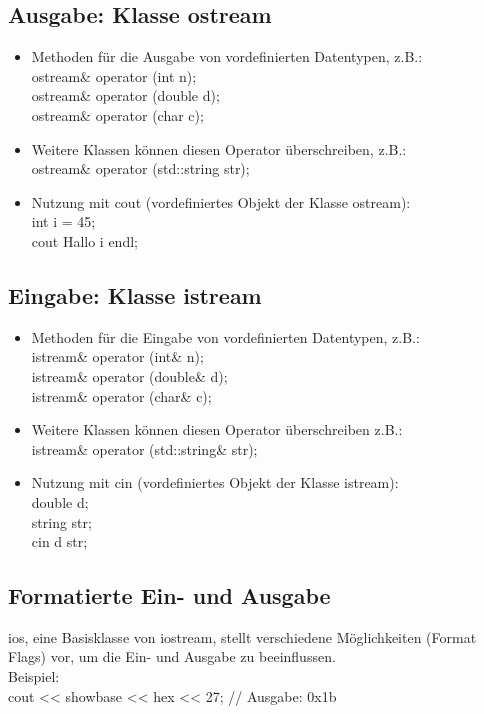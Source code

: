 \subsection{Ausgabe: Klasse ostream}
\label{sec:ostream}
\begin{itemize}
	\item Methoden für die Ausgabe von vordefinierten Datentypen, z.B.:
		\\ ostream\& operator \flq\flq(int n);
		\\ ostream\& operator \flq\flq(double d);
		\\ ostream\& operator \flq\flq(char c);
	\item Weitere Klassen können diesen Operator überschreiben, z.B.:
		\\ ostream\& operator \flq\flq(std::string str);
	\item Nutzung mit cout (vordefiniertes Objekt der Klasse ostream):
		\\ int i = 45;
		\\cout \flq\flq \grqq Hallo  \grqq \flq\flq i \flq\flq endl;
\end{itemize}

\subsection{Eingabe: Klasse istream}
\label{sec:istream}
\begin{itemize}
	\item Methoden für die Eingabe von vordefinierten Datentypen, z.B.:
		\\ istream\& operator \frq\frq(int\& n);
		\\ istream\& operator \frq\frq(double\& d);
		\\ istream\& operator \frq\frq(char\& c);
	\item Weitere Klassen können diesen Operator überschreiben z.B.:
		\\ istream\& operator \frq\frq(std::string\& str);
	\item Nutzung mit cin (vordefiniertes Objekt der Klasse istream):
		\\ double d;
		\\ string str;
		\\ cin \frq\frq d \frq\frq str;
\end{itemize}

\subsection{Formatierte Ein- und Ausgabe}
\label{sec:Formatierte Ein- und Ausgabe}
ios, eine Basisklasse von iostream, stellt verschiedene Möglichkeiten (Format Flags) vor, um die Ein- und Ausgabe zu beeinflussen.\\
Beispiel:\\
cout << \color{red}showbase\color{black} << \color{green}hex\color{black} << 27;	// Ausgabe: \color{red}0x\color{green}1b \color{black}

